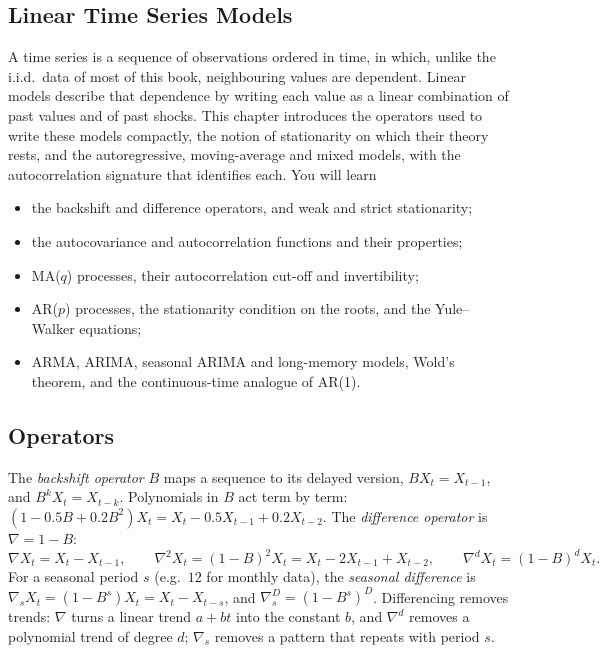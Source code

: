 \begin{notechapter}
\chapter{Linear Time Series Models}\label{ch:linear-time-series}

\begin{chapterintro}
A time series is a sequence of observations ordered in time, in which, unlike the
i.i.d.\ data of most of this book, neighbouring values are dependent. Linear models
describe that dependence by writing each value as a linear combination of past
values and of past shocks. This chapter introduces the operators used to write these
models compactly, the notion of stationarity on which their theory rests, and the
autoregressive, moving-average and mixed models, with the autocorrelation
signature that identifies each. You will learn
\begin{itemize}[nosep]
  \item the backshift and difference operators, and weak and strict stationarity;
  \item the autocovariance and autocorrelation functions and their properties;
  \item MA($q$) processes, their autocorrelation cut-off and invertibility;
  \item AR($p$) processes, the stationarity condition on the roots, and the Yule--Walker
        equations;
  \item ARMA, ARIMA, seasonal ARIMA and long-memory models, Wold's theorem, and the
        continuous-time analogue of AR(1).
\end{itemize}
\end{chapterintro}

\section{Operators}\label{linear-time-series:sec:operators}

The \emph{backshift operator} $B$ maps a sequence to its delayed version, $BX_t = X_{t-1}$, and
$B^kX_t = X_{t-k}$. Polynomials in $B$ act term by term: $(1 - 0.5B + 0.2B^2)X_t = X_t - 0.5X_{t-1} + 0.2X_{t-2}$. The
\emph{difference operator} is $\nabla = 1 - B$:
\[
  \nabla X_t = X_t - X_{t-1},\qquad
  \nabla^2X_t = (1 - B)^2X_t = X_t - 2X_{t-1} + X_{t-2},\qquad
  \nabla^dX_t = (1 - B)^dX_t .
\]
For a seasonal period $s$ (e.g.\ $12$ for monthly data), the \emph{seasonal difference} is
$\nabla_sX_t = (1 - B^s)X_t = X_t - X_{t-s}$, and $\nabla_s^D = (1 - B^s)^D$. Differencing removes trends: $\nabla$ turns a
linear trend $a + bt$ into the constant $b$, and $\nabla^d$ removes a polynomial trend of degree $d$;
$\nabla_s$ removes a pattern that repeats with period $s$.


\end{notechapter}
